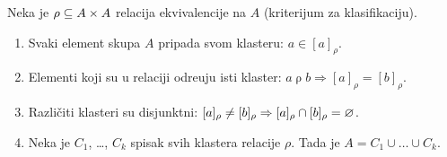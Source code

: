 \begin{THM}\label{ft07.thm.ekviv}
  Neka je $\mbox{$\rho$} \subseteq A \times A$ relacija ekvivalencije na $A$ (kriterijum za klasifikaciju).
  \begin{enumerate}\itemsep -1pt
  \item
    Svaki element skupa $A$ pripada svom klasteru: $a \in [a]_\rho$.
  \item
    Elementi koji su u relaciji odre\dj uju isti klaster:
    $a \mathrel{\rho} b \Rightarrow [a]_\rho = [b]_\rho$.
  \item
    Razli\v citi klasteri su disjunktni:
    $[a]_\rho \ne [b]_\rho \Rightarrow [a]_\rho \cap [b]_\rho = \varnothing$.
  \item
    Neka je $C_1$, \ldots, $C_k$ spisak svih klastera relacije $\rho$. Tada je
	$A = C_1 \cup \ldots \cup C_k$.
  \end{enumerate}
\end{THM}
